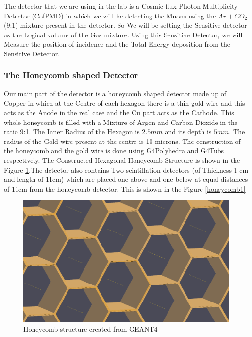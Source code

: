 \documentclass{article}
\begin{document}
\begin{multicols}{2}
The detector that we are using in the lab is a Cosmic flux Photon Multiplicity Detector (CofPMD) in which we will be detecting
the Muons using the $Ar+CO_2$ (9:1) mixture present in the detector. So We will be setting the Sensitive detector as the Logical volume
of the Gas mixture. Using this Sensitive Detector, we will Measure the position of incidence and the Total  Energy deposition
from the Sensitive Detector.

\subsubsection{The Honeycomb shaped Detector}

Our main part of the detector is a honeycomb shaped detector made up of Copper in which at the Centre of each
hexagon there is a thin gold wire and this acts as the Anode in the real case and the Cu part acts as the Cathode. This whole
honeycomb is filled with a Mixture of Argon and Carbon Dioxide in the ratio 9:1. The Inner Radius of the Hexagon is $2.5mm$
and its depth is $5mm$. The radius of the Gold wire present at the centre is 10 microns. The construction of the honeycomb
and the gold wire is done using G4Polyhedra and G4Tubs respectively. The Constructed Hexagonal Honeycomb Structure is 
shown in the Figure-\ref{honeycomb}.The detector also contains Two scintillation detectors (of Thickness 1 cm and length of 11cm)  which are placed one above and one below at equal distances of 11cm
from the honeycomb detector. This is shown in the Figure-\ref{honeycomb1}

\begin{figure}[H]
    \centering	
     \includegraphics[width=\columnwidth]{honeycomb.png}
     \caption{Honeycomb structure created from GEANT4}
     \label{honeycomb}
\end{figure}


\end{multicols}
\end{document}
